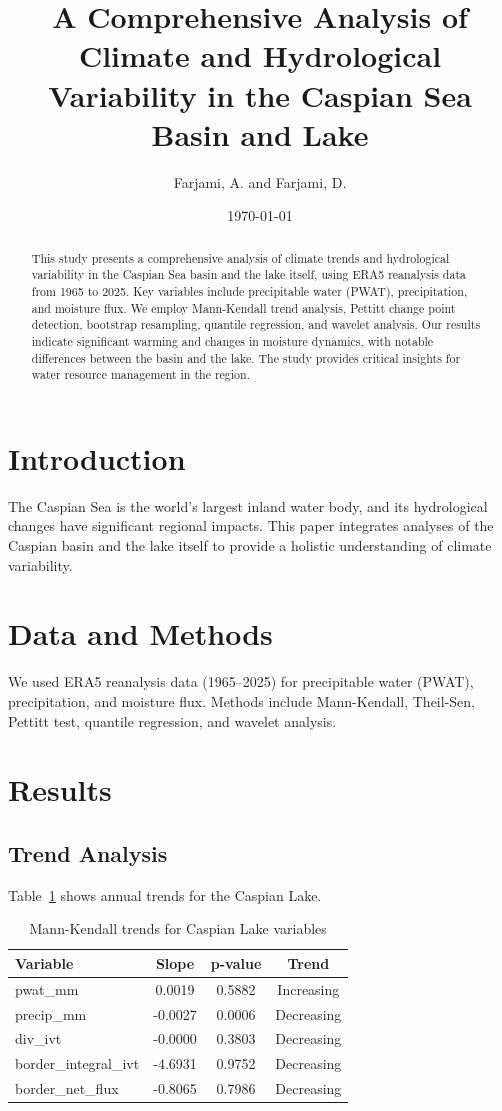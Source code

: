 \documentclass[12pt,a4paper]{article}
\title{A Comprehensive Analysis of Climate and Hydrological Variability in the Caspian Sea Basin and Lake}
\author{Farjami, A. and Farjami, D.}
\date{\today}
\begin{document}
\maketitle

\begin{abstract}
This study presents a comprehensive analysis of climate trends and hydrological variability in the Caspian Sea basin and the lake itself, using ERA5 reanalysis data from 1965 to 2025. Key variables include precipitable water (PWAT), precipitation, and moisture flux. We employ Mann-Kendall trend analysis, Pettitt change point detection, bootstrap resampling, quantile regression, and wavelet analysis. Our results indicate significant warming and changes in moisture dynamics, with notable differences between the basin and the lake. The study provides critical insights for water resource management in the region.
\end{abstract}

\section{Introduction}
The Caspian Sea is the world's largest inland water body, and its hydrological changes have significant regional impacts. This paper integrates analyses of the Caspian basin and the lake itself to provide a holistic understanding of climate variability.

\section{Data and Methods}
We used ERA5 reanalysis data (1965–2025) for precipitable water (PWAT), precipitation, and moisture flux. Methods include Mann-Kendall, Theil-Sen, Pettitt test, quantile regression, and wavelet analysis.

\section{Results}

\subsection{Trend Analysis}
Table~\ref{tab:mk} shows annual trends for the Caspian Lake.
\begin{table}[h]
\centering
\caption{Mann-Kendall trends for Caspian Lake variables}
\label{tab:mk}
\begin{tabular}{lccc}
\toprule
Variable & Slope & p-value & Trend \\
\midrule
pwat_mm & 0.0019 & 0.5882 & Increasing \\
precip_mm & -0.0027 & 0.0006 & Decreasing \\
div_ivt & -0.0000 & 0.3803 & Decreasing \\
border_integral_ivt & -4.6931 & 0.9752 & Decreasing \\
border_net_flux & -0.8065 & 0.7986 & Decreasing \\

\bottomrule
\end{tabular}
\end{table}
\end{document}
